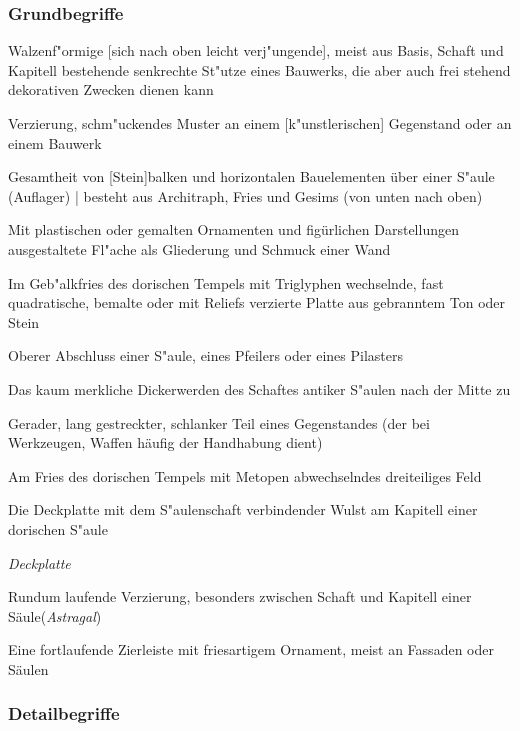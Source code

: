 \documentclass[emulatestandardclasses]{scrartcl}
\begin{document}
\subsubsection{Grundbegriffe}

\begin{description}[leftmargin=!,labelwidth=\widthof{\bfseries Perlenstab}]
  \item[S"aule] Walzenf"ormige [sich nach oben leicht verj"ungende], meist aus Basis, Schaft und Kapitell bestehende senkrechte St"utze eines Bauwerks, die aber auch frei stehend dekorativen Zwecken dienen kann
  \item[Ornament] Verzierung, schm"uckendes Muster an einem [k"unstlerischen] Gegenstand oder an einem Bauwerk
  \item[Geb"alk] Gesamtheit von [Stein]balken und horizontalen Bauelementen über einer S"aule (Auflager) | besteht aus Architraph, Fries und Gesims (von unten nach oben)
  \item[Fries] Mit plastischen oder gemalten Ornamenten und figürlichen Darstellungen ausgestaltete Fl"ache als Gliederung und Schmuck einer Wand
  \item[Metope] Im Geb"alkfries des dorischen Tempels mit Triglyphen wechselnde, fast quadratische, bemalte oder mit Reliefs verzierte Platte aus gebranntem Ton oder Stein
  \item[Kapitell] Oberer Abschluss einer S"aule, eines Pfeilers oder eines Pilasters
  \item[Entasis] Das kaum merkliche Dickerwerden des Schaftes antiker S"aulen nach der Mitte zu
  \item[Schaft] Gerader, lang gestreckter, schlanker Teil eines Gegenstandes (der bei Werkzeugen, Waffen häufig der Handhabung dient)
  \item[Triglyph] Am Fries des dorischen Tempels mit Metopen abwechselndes dreiteiliges Feld
  \item[Echinus] Die Deckplatte mit dem S"aulenschaft verbindender Wulst am Kapitell einer dorischen S"aule
  \item[Abakus] \emph{Deckplatte}
  \item[Perlenstab] Rundum laufende Verzierung, besonders zwischen Schaft und Kapitell einer Säule(\emph{Astragal})
  \item[Eierstab] Eine fortlaufende Zierleiste mit friesartigem Ornament, meist an Fassaden oder Säulen
\end{description}

\subsubsection{Detailbegriffe}
\end{document}
